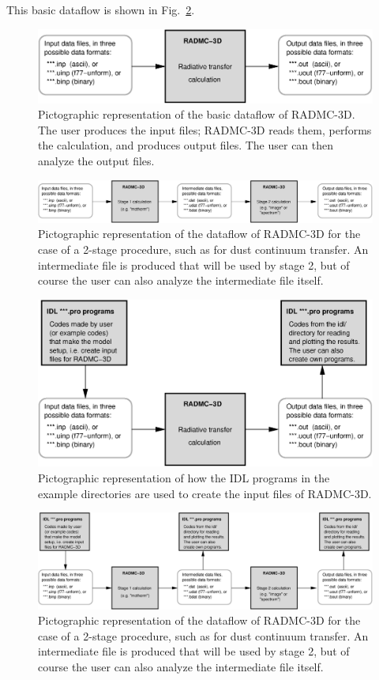 \documentclass{report}
\begin{document}
This basic dataflow is shown in Fig.~\ref{fig-dataflow-twostage}.
%
\begin{figure}
\centerline{\includegraphics[height=0.13\textwidth]{dataflow_basic.eps}}
\caption{\label{fig-dataflow-basic}
Pictographic representation of the basic dataflow of RADMC-3D. The user
produces the input files; RADMC-3D reads them, performs the calculation,
and produces output files. The user can then analyze the output files.
}
\end{figure}
%
%
\begin{figure}
\centerline{\includegraphics[height=0.13\textwidth]{dataflow_twostage.eps}}
\caption{\label{fig-dataflow-twostage}
Pictographic representation of the dataflow of RADMC-3D for the case
of a 2-stage procedure, such as for dust continuum transfer. An intermediate
file is produced that will be used by stage 2, but of course the user can
also analyze the intermediate file itself. 
}
\end{figure}
%
%
\begin{figure}
\centerline{\includegraphics[height=0.28\textwidth]{dataflow_basic_idl.eps}}
\caption{\label{fig-dataflow-basic-idl}
Pictographic representation of how the IDL programs in the example directories
are used to create the input files of RADMC-3D. 
}
\end{figure}
%
%
\begin{figure}
\centerline{\includegraphics[height=0.28\textwidth]{dataflow_twostage_idl.eps}}
\caption{\label{fig-dataflow-twostage-idl}
Pictographic representation of the dataflow of RADMC-3D for the case
of a 2-stage procedure, such as for dust continuum transfer. An intermediate
file is produced that will be used by stage 2, but of course the user can
also analyze the intermediate file itself. 
}
\end{figure}
%
\end{document}
